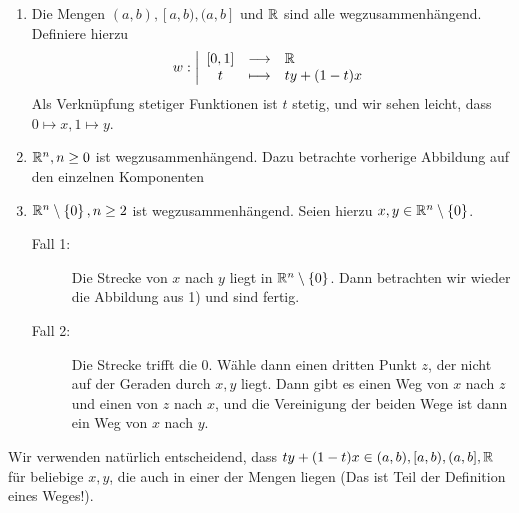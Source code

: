 \begin{example}
    \begin{enumerate}[1)]
        \item     Die Mengen $(a,b), [a,b), (a,b]$ und $\mathbb{R}$ sind alle wegzusammenhängend. Definiere hierzu
        \begin{equation*}
        w: \left| \begin{array}{c c l} 
            [0,1] & \longrightarrow & \mathbb{R} \\
            t & \longmapsto &  ty + (1-t)x
        \end{array} \right.
    \end{equation*}
   Als Verknüpfung stetiger Funktionen ist $t$ stetig, und wir sehen leicht, dass  $0 \mapsto x, 1 \mapsto y$. 
   \item $\mathbb{R}^n, n\geq 0$ ist wegzusammenhängend. Dazu betrachte vorherige Abbildung auf den einzelnen Komponenten
   \item $\mathbb{R}^n \setminus \left \{0\right\} , n\geq 2$ ist wegzusammenhängend. Seien hierzu $x,y\in \mathbb{R}^n \setminus \left \{0\right\}$.
       \begin{description}
           \item[Fall 1:] Die Strecke von $x$ nach  $y$ liegt in  $\mathbb{R}^n \setminus \left \{0\right\}$. Dann betrachten wir wieder die Abbildung aus 1) und sind fertig.
           \item[Fall 2:] Die Strecke trifft die $0$. Wähle dann einen dritten Punkt $z$, der nicht auf der Geraden durch $x,y$ liegt. Dann gibt es einen Weg von $x$ nach  $z$ und einen von  $z$ nach  $x$, und die Vereinigung der beiden Wege ist dann ein Weg von  $x$ nach  $y$.
       \end{description}
    \end{enumerate}
\end{example}

\begin{remark*}
    Wir verwenden natürlich entscheidend, dass $ty + (1-t)x \in (a,b),[a,b),(a,b],\mathbb{R}$ für beliebige $x,y$, die auch in einer der Mengen liegen (Das ist Teil der Definition eines Weges!).
\end{remark*}

